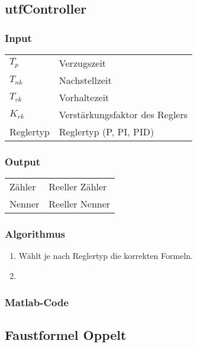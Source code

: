 \subsection{utfController}

\subsubsection*{Input}

\begin{tabular}{p{40mm}l}
    $ T_p $        & Verzugszeit \\
    $ T_{nk} $     & Nachstellzeit \\
    $ T_{vk} $     & Vorhaltezeit \\
    $ K_{rk} $     & Verst\"arkungsfaktor des Reglers \\
      Reglertyp    & Reglertyp (P, PI, PID)
\end{tabular}

\subsubsection*{Output}
\begin{tabular}{p{40mm}l}
    Z\"ahler & Reeller Z\"ahler \\
    Nenner   & Reeller Nenner
\end{tabular}

\subsubsection*{Algorithmus}
\begin{enumerate}
    \item
        W\"ahlt je nach Reglertyp die korrekten Formeln.
    \item
\end{enumerate}

\subsubsection*{Matlab-Code}


\subsection{Faustformel Oppelt}

